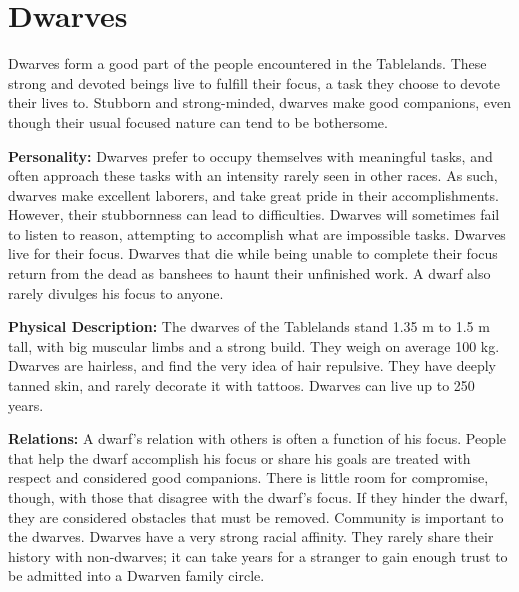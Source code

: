 \section{Dwarves}

Dwarves form a good part of the people encountered in the Tablelands. These strong and devoted beings live to fulfill their focus, a task they choose to devote their lives to. Stubborn and strong-minded, dwarves make good companions, even though their usual focused nature can tend to be bothersome.

\textbf{Personality:} Dwarves prefer to occupy themselves with meaningful tasks, and often approach these tasks with an intensity rarely seen in other races. As such, dwarves make excellent laborers, and take great pride in their accomplishments. However, their stubbornness can lead to difficulties. Dwarves will sometimes fail to listen to reason, attempting to accomplish what are impossible tasks. Dwarves live for their focus. Dwarves that die while being unable to complete their focus return from the dead as banshees to haunt their unfinished work. A dwarf also rarely divulges his focus to anyone.

\textbf{Physical Description:} The dwarves of the Tablelands stand 1.35 m to 1.5 m tall, with big muscular limbs and a strong build. They weigh on average 100 kg. Dwarves are hairless, and find the very idea of hair repulsive. They have deeply tanned skin, and rarely decorate it with tattoos. Dwarves can live up to 250 years.

\textbf{Relations:} A dwarf's relation with others is often a function of his focus. People that help the dwarf accomplish his focus or share his goals are treated with respect and considered good companions. There is little room for compromise, though, with those that disagree with the dwarf's focus. If they hinder the dwarf, they are considered obstacles that must be removed. Community is important to the dwarves. Dwarves have a very strong racial affinity. They rarely share their history with non-dwarves; it can take years for a stranger to gain enough trust to be admitted into a Dwarven family circle.


